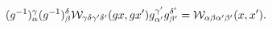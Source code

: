 \begin{equation}
(g^{-1})^{\gamma}_{\alpha}(g^{-1})^{\delta}_{\beta} {\cal
W}_{\gamma\delta \gamma'\delta'} (g x,g x')g^{\gamma'}_{\alpha'}
g^{\delta'}_{\beta'}= {\cal W}_{\alpha\beta \alpha'\beta'}(x,x') .
\end{equation}

